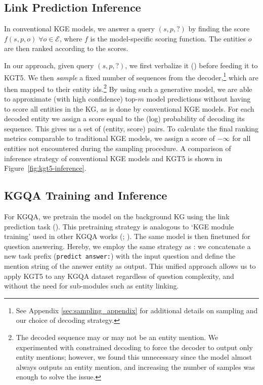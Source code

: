 \documentclass[11pt]{article}
\renewcommand\:{\colon} \newcommand{\sset}[1]{\left\{\,#1\,\right\}} \newcommand{\ssets}[1]{\left\{#1\right\}} \newcommand{\ssetn}[1]{\{\,#1\,\}}
\newcommand\cE{\mathcal{E}}
\newcommand{\method}{\textsc{KGT5}}
\begin{document}
\subsection{Link Prediction Inference}
\label{sec:lp_inference}
In conventional KGE models, we answer a query $(s,p,?)$  by finding the score $f(s,p,o) \; \forall o \in \cE$, where $f$ is the model-specific scoring function. The entities $o$ are then ranked according to the scores.

In our approach, given query $(s,p,?)$, we first verbalize it () before feeding it to KGT5.
We then \textit{sample} a fixed number of sequences from the decoder,\footnote{See Appendix \ref{sec:sampling_appendix} for additional details on sampling and our choice of decoding strategy.} which are then mapped to their entity ids.\footnote{
    The decoded sequence may or may not be an entity mention. We experimented with constrained decoding \cite{decao2020autoregressive} to force the decoder to output only entity mentions; however, we found this unnecessary since the model almost always outputs an entity mention, and increasing the number of samples was enough to solve the issue.
}
By using such a generative model, we are able to approximate (with high confidence) top-$m$ model predictions without having to score all entities in the KG, as is done by conventional KGE models.
For each decoded entity we assign a score equal to the (log) probability of decoding its sequence. This gives us a set of (entity, score) pairs. 
To calculate the final ranking metrics comparable to traditional KGE models, we assign a score of $-\infty$ for all entities not encountered during the sampling procedure. A comparison of inference strategy of conventional KGE models and \method{} is shown in Figure~\ref{fig:kgt5-inference}.







\subsection{KGQA Training and Inference}
\label{sec:kgqa_training_and_inference}
For KGQA, we pretrain the model on the background KG using the link prediction task (). This pretraining strategy is analogous to `KGE module training' used in other KGQA works (\citealt{sun2021faithful}; \citealt{ren2021lego}). The same model is then finetuned for question answering.
Hereby, we employ the same strategy as \citet{roberts-etal-2020-much}: we concatenate a new task prefix (\texttt{predict answer:}) with the input question and define the mention string of the answer entity as output. 
This unified approach allows us to apply \method{} to any KGQA dataset regardless of question complexity, and without the need for sub-modules such as entity linking.
\end{document}
